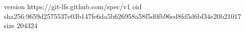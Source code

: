 version https://git-lfs.github.com/spec/v1
oid sha256:9659d2575537e03b147fe6da5b626958a58f5d0fb96ed8fd5d6bf34e20b21017
size 204324
